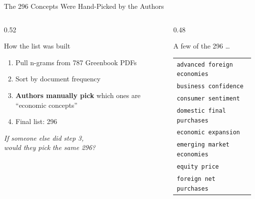 \documentclass[10pt,aspectratio=169]{beamer}
\begin{document}
\begin{frame}{The 296 Concepts Were Hand-Picked by the Authors}
  \begin{columns}[T]
    \begin{column}{0.52\textwidth}
      \vspace{4pt}
      \begin{block}{How the list was built}
        \begin{enumerate}
          \item Pull n-grams from 787 Greenbook PDFs
          \item Sort by document frequency
          \item \textbf{Authors manually pick} which ones are ``economic concepts''
          \item Final list: 296
        \end{enumerate}
      \end{block}
      \vspace{6pt}
      \begin{alertblock}{}
        \centering
        \textit{If someone else did step 3,\\would they pick the same 296?}
      \end{alertblock}
    \end{column}
    \begin{column}{0.48\textwidth}
      \begin{center}
        {\scriptsize A few of the 296 \ldots}\\[4pt]
        {\footnotesize
        \begin{tabular}{l}
          \texttt{advanced foreign economies}\\
          \texttt{business confidence}\\
          \texttt{consumer sentiment}\\
          \texttt{domestic final purchases}\\
          \texttt{economic expansion}\\
          \texttt{emerging market economies}\\
          \texttt{equity price}\\
          \texttt{foreign net purchases}\\
        \end{tabular}}
      \end{center}
    \end{column}
  \end{columns}
\end{frame}
\end{document}
